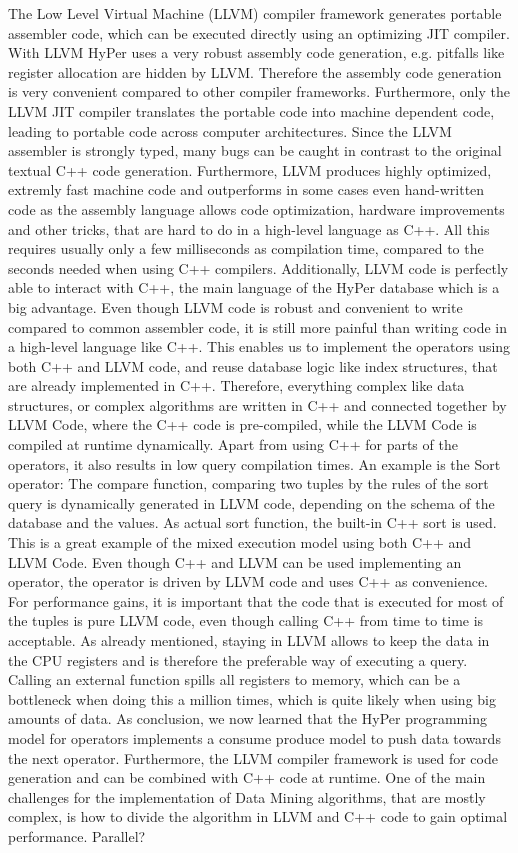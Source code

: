 The Low Level Virtual Machine (LLVM) compiler framework generates portable assembler code, which can be executed directly using an optimizing  JIT compiler. With LLVM HyPer uses a very robust assembly code generation, e.g. pitfalls like register allocation are hidden by LLVM. Therefore the assembly code generation is very convenient compared to other compiler frameworks. Furthermore, only the LLVM JIT compiler translates the portable code into machine dependent code, leading to portable code across computer architectures. Since the LLVM assembler is strongly typed, many bugs can be caught in contrast to the original textual C++ code generation. Furthermore, LLVM produces highly optimized, extremly fast machine code and outperforms in some cases even hand-written code as the assembly language allows code optimization, hardware improvements and other tricks, that are hard to do in a high-level language as C++. All this requires usually only a few milliseconds as compilation time, compared to the seconds needed when using C++ compilers. 
Additionally, LLVM code is perfectly able to interact with C++, the main language of the HyPer database which is a big advantage. Even though LLVM code is robust and convenient to write compared to common assembler code, it is still more painful than writing code in a high-level language like C++. This enables us to implement the operators using both C++ and LLVM code, and reuse database logic like index structures, that are already implemented in C++. 
Therefore, everything complex like data structures, or complex algorithms are written in C++ and connected together by LLVM Code, where the C++ code is pre-compiled, while the LLVM Code is compiled at runtime dynamically. Apart from using C++ for parts of the operators, it also results in low query compilation times. An example is the Sort operator: The compare function, comparing two tuples by the rules of the sort query is dynamically generated in LLVM code, depending on the schema of the database and the values. As actual sort function, the built-in C++ sort is used. This is a great example of the mixed execution model using both C++ and LLVM Code.
Even though C++ and LLVM can be used implementing an operator, the operator is driven by LLVM code and uses C++ as convenience. For performance gains, it is important that the code that is executed for most of the tuples is pure LLVM code, even though calling C++ from time to time is acceptable. As already mentioned, staying in LLVM allows to keep the data in the CPU registers and is therefore the preferable way of executing a query. Calling an external function spills all registers to memory, which can be a bottleneck when doing this a million times, which is quite likely when using big amounts of data.
As conclusion, we now learned that the HyPer programming model for operators implements a consume produce model to push data towards the next operator. Furthermore, the LLVM compiler framework is used for code generation and can be combined with C++ code at runtime. 
One of the main challenges for the implementation of Data Mining algorithms, that are mostly complex, is how to divide the algorithm in LLVM and C++ code to gain optimal performance.
Parallel?


